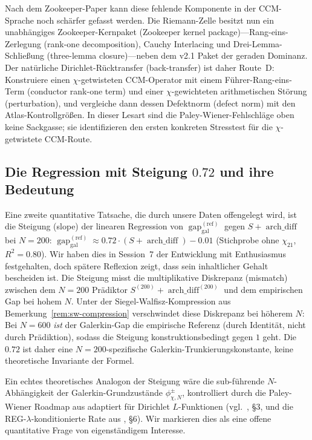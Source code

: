\documentclass[10pt,twocolumn]{article}
\theoremstyle{definition}
\theoremstyle{remark}
\newcommand{\gap}{\operatorname{gap}}
\newcommand{\chifn}{\chi}
\newcommand{\archdiff}{\operatorname{arch\_diff}}
\begin{document}
Nach dem Zookeeper-Paper \cite{Zookeeper2026} kann diese fehlende
Komponente in der CCM-Sprache noch schärfer gefasst werden. Die Riemann-Zelle
besitzt nun ein unabhängiges Zookeeper-Kernpaket (Zookeeper kernel package)---Rang-eins-Zerlegung (rank-one decomposition),
Cauchy Interlacing und Drei-Lemma-Schließung (three-lemma closure)---neben
dem v2.1 Paket der geraden Dominanz. Der natürliche Dirichlet-Rücktransfer (back-transfer)
ist daher Route~D: Konstruiere einen $\chifn$-getwisteten CCM-Operator mit
einem Führer-Rang-eins-Term (conductor rank-one term) und einer $\chifn$-gewichteten arithmetischen
Störung (perturbation), und vergleiche dann dessen Defektnorm (defect norm) mit den Atlas-Kontrollgrößen.
In dieser Lesart sind die Paley-Wiener-Fehlschläge oben keine
Sackgasse; sie identifizieren den ersten konkreten Stresstest für die
$\chifn$-getwistete CCM-Route.

\subsection{\texorpdfstring{Die Regression mit Steigung $0.72$ und ihre Bedeutung}{Die Regression mit Steigung 0.72 und ihre Bedeutung}}
\label{sec:discussion-slope}

Eine zweite quantitative Tatsache, die durch unsere Daten offengelegt wird, ist die Steigung (slope)
der linearen Regression von $\gap_{\mathrm{gal}}^{(\mathrm{ref})}$ gegen
$S+\archdiff$ bei $N=200$:
$\gap_{\mathrm{gal}}^{(\mathrm{ref})}\approx 0.72\cdot(S+\archdiff)-0.01$
(Stichprobe ohne $\chifn_{21}$, $R^2=0.80$). Wir haben dies in Session~7 der
Entwicklung mit Enthusiasmus festgehalten, doch spätere Reflexion zeigt, dass
sein inhaltlicher Gehalt bescheiden ist. Die Steigung misst die multiplikative
Diskrepanz (mismatch) zwischen dem $N=200$ Prädiktor $S^{(200)}+\archdiff^{(200)}$
und dem empirischen Gap bei hohem $N$. Unter der Siegel-Walfisz-Kompression
aus Bemerkung~\ref{rem:sw-compression} verschwindet diese Diskrepanz
bei höherem $N$: Bei $N=600$ \emph{ist} der Galerkin-Gap
die empirische Referenz (durch Identität, nicht durch Prädiktion), sodass die
Steigung konstruktionsbedingt gegen $1$ geht. Die $0.72$ ist daher eine
$N=200$-spezifische Galerkin-Trunkierungskonstante, keine theoretische
Invariante der Formel.

Ein echtes theoretisches Analogon der Steigung wäre die
sub-führende $N$-Abhängigkeit der Galerkin-Grundzustände
$\phi^\pm_{\chifn,N}$, kontrolliert durch die Paley-Wiener Roadmap aus
\cite{RH_II} adaptiert für Dirichlet $L$-Funktionen (vgl.\
\cite{AnalyticGroundstate}, \S3, und die REG-$\lambda$-konditionierte
Rate aus \cite{RH_II}, \S6). Wir markieren dies als eine offene quantitative
Frage von eigenständigem Interesse.
\end{document}
